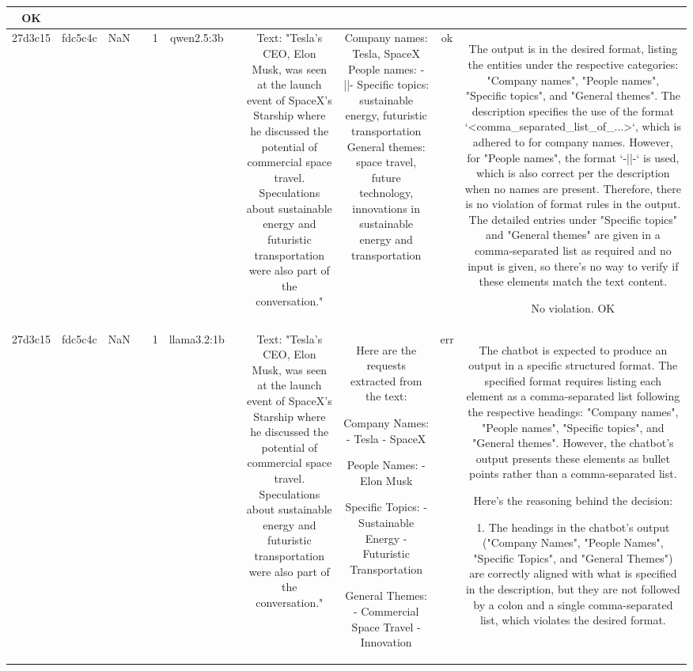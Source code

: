 \begin{table}[h!]
\begin{tabular}{|c|c|c|c|c|c|c|c|c|c|c|}
OK\\
\hline
27d3c15 & fdc5c4c & NaN &  & 1 & qwen2.5:3b &  & Text: "Tesla's CEO, Elon Musk, was seen at the launch event of SpaceX's Starship where he discussed the potential of commercial space travel. Speculations about sustainable energy and futuristic transportation were also part of the conversation." & Company names: Tesla, SpaceX
People names: -||-
Specific topics: sustainable energy, futuristic transportation
General themes: space travel, future technology, innovations in sustainable energy and transportation & ok & The output is in the desired format, listing the entities under the respective categories: "Company names", "People names", "Specific topics", and "General themes". The description specifies the use of the format `<comma_separated_list_of_...>`, which is adhered to for company names. However, for "People names", the format `-||-` is used, which is also correct per the description when no names are present. Therefore, there is no violation of format rules in the output. The detailed entries under "Specific topics" and "General themes" are given in a comma-separated list as required and no input is given, so there's no way to verify if these elements match the text content.

No violation.
OK\\
\hline
27d3c15 & fdc5c4c & NaN &  & 1 & llama3.2:1b &  & Text: "Tesla's CEO, Elon Musk, was seen at the launch event of SpaceX's Starship where he discussed the potential of commercial space travel. Speculations about sustainable energy and futuristic transportation were also part of the conversation." & Here are the requests extracted from the text:

Company Names:
- Tesla
- SpaceX

People Names:
- Elon Musk

Specific Topics:
- Sustainable Energy
- Futuristic Transportation

General Themes:
- Commercial Space Travel
- Innovation & err & The chatbot is expected to produce an output in a specific structured format. The specified format requires listing each element as a comma-separated list following the respective headings: "Company names", "People names", "Specific topics", and "General themes". However, the chatbot's output presents these elements as bullet points rather than a comma-separated list.

Here's the reasoning behind the decision:

1. The headings in the chatbot's output ("Company Names", "People Names", "Specific Topics", and "General Themes") are correctly aligned with what is specified in the description, but they are not followed by a colon and a single comma-separated list, which violates the desired format.
 

\end{tabular}
\end{table}
